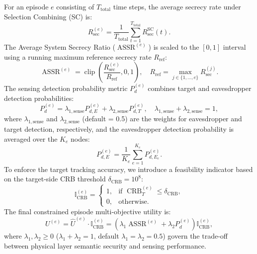 \documentclass[journal,onecolumn]{IEEEtran}
\begin{document}
For an episode $e$ consisting of $T_{\text{total}}$ time steps, the average secrecy rate under Selection Combining (SC) is:
\begin{equation}
    R_{\text{sec}}^{(e)} = \frac{1}{T_{\text{total}}} \sum_{t=1}^{T_{\text{total}}} R_{\text{sec}}^{\text{SC}}(t).
\end{equation}
The Average System Secrecy Ratio ($\operatorname{ASSR}^{(e)}$) is scaled to the $[0, 1]$ interval using a running maximum reference secrecy rate $R_{\text{ref}}$:
\begin{equation}
    \operatorname{ASSR}^{(e)} = \operatorname{clip}\left( \frac{R_{\text{sec}}^{(e)}}{R_{\text{ref}}}, 0, 1 \right), \quad R_{\text{ref}} = \max_{j \in \{1, \dots, e\}} R_{\text{sec}}^{(j)}.
\end{equation}
The sensing detection probability metric $P_d^{(e)}$ combines target and eavesdropper detection probabilities:
\begin{equation}
    P_d^{(e)} = \lambda_{1,\text{sense}} P_{d, E}^{(e)} + \lambda_{2,\text{sense}} P_{d, T}^{(e)}, \quad \lambda_{1,\text{sense}} + \lambda_{2,\text{sense}} = 1,
\end{equation}
where $\lambda_{1,\text{sense}}$ and $\lambda_{2,\text{sense}}$ (default = 0.5) are the weights for eavesdropper and target detection, respectively, and the eavesdropper detection probability is averaged over the $K_e$ nodes:
\begin{equation}
    P_{d, E}^{(e)} = \frac{1}{K_e} \sum_{e=1}^{K_e} P_{d, E_e}^{(e)}.
\end{equation}
To enforce the target tracking accuracy, we introduce a feasibility indicator based on the target-side CRB threshold $\delta_{\text{CRB}} = 10^8$:
\begin{equation}
    \mathbb{I}_{\text{CRB}}^{(e)} =
    \begin{cases}
        1, & \text{if } \operatorname{CRB}_{T}^{(e)} \le \delta_{\text{CRB}}, \\
        0, & \text{otherwise.}
    \end{cases}
\end{equation}
The final constrained episode multi-objective utility is:
\begin{equation}
    U^{(e)} = \widehat{U}^{(e)} \cdot \mathbb{I}_{\text{CRB}}^{(e)} = \left( \lambda_1 \operatorname{ASSR}^{(e)} + \lambda_2 P_d^{(e)} \right) \mathbb{I}_{\text{CRB}}^{(e)},
\end{equation}
where $\lambda_1, \lambda_2 \ge 0$ ($\lambda_1 + \lambda_2 = 1$, default $\lambda_1 = \lambda_2 = 0.5$) govern the trade-off between physical layer semantic security and sensing performance.
\end{document}
